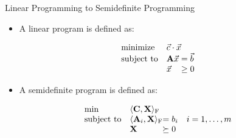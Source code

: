 \documentclass[
	11pt, %
]{beamer}
\begin{document}
\begin{frame}[label={sec:org62a97b6}]{Linear Programming to Semidefinite Programming}
\begin{itemize}
\item A linear program is defined as:
\end{itemize}
\begin{align*}
  \begin{array}{ll@{}ll}
    \text{minimize}   & \vec{c} \cdot \vec{x}& \\
    \text{subject to} & \mathbf{A} \vec{x} &=  \vec{b} \\
                      & \vec{x} &\geq 0 \\
    \end{array}
\end{align*}
\begin{itemize}
\item A semidefinite program is defined as:
\end{itemize}
\begin{align*}
  \begin{array}{ll@{}ll}
  \min              & \langle \mathbf{C}, \mathbf{X} \rangle_{\mathrm{F}}                   & \\
  \text{subject to} & \langle \mathbf{A}_i, \mathbf{X} \rangle_{\mathrm{F}} &= b_i       & i=1 ,\dots, m\\
                    & \mathbf{X}                      &\succeq 0
  \end{array}
\end{align*}
\end{frame}
\end{document}
